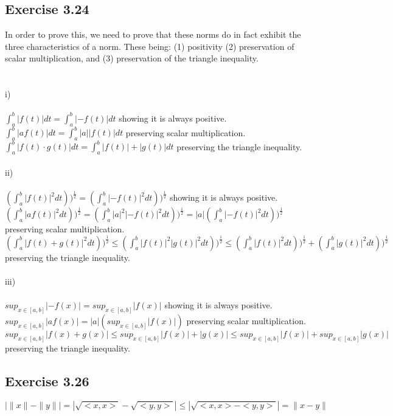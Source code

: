 \documentclass[letterpaper,12pt]{article}
\theoremstyle{definition}
\begin{document}
\subsection*{Exercise 3.24}
In order to prove this, we need to prove that these norms do in fact exhibit the three characteristics of a norm. These being: (1) positivity (2) preservation of scalar multiplication, and (3) preservation of the triangle inequality. \\ \\ \\ 
i) \\ \\
$\int_{a}^{b}|f(t)| dt = \int_{a}^{b}|-f(t)| dt$ showing it is always positive. \\
$\int_{a}^{b}|af(t)| dt = \int_{a}^{b}|a||f(t)| dt$ preserving scalar multiplication. \\
$\int_{a}^{b}|f(t) \cdot g(t)| dt = \int_{a}^{b}|f(t)| + |g(t)| dt$ preserving the triangle inequality. \\ \\
ii) \\ \\ 
$(\int_{a}^{b}|f(t)|^{2} dt))^{\frac{1}{2}} = (\int_{a}^{b}|-f(t)|^{2} dt))^{\frac{1}{2}}$ showing it is always positive. \\
$(\int_{a}^{b}|af(t)|^{2} dt))^{\frac{1}{2}} = (\int_{a}^{b}|a|^{2}|-f(t)|^{2} dt))^{\frac{1}{2}} = |a|(\int_{a}^{b}|-f(t)|^{2} dt))^{\frac{1}{2}}$ preserving scalar multiplication. \\
$(\int_{a}^{b}|f(t)+g(t)|^{2} dt))^{\frac{1}{2}} \leq (\int_{a}^{b}|f(t)|^{2}|g(t)|^{2} dt))^{\frac{1}{2}} \leq (\int_{a}^{b}|f(t)|^{2} dt))^{\frac{1}{2}} + (\int_{a}^{b}|g(t)|^{2} dt))^{\frac{1}{2}}$ preserving the triangle inequality. \\ \\
iii) \\ \\ 
$sup_{x \in [a,b]} |-f(x)| = sup_{x \in [a,b]} |f(x)|$ showing it is always positive.\\
$ sup_{x \in [a,b]} |af(x)| = |a| (sup_{x \in [a,b]} |f(x)|)$ preserving scalar multiplication.\\
$sup_{x \in [a,b]} |f(x) + g(x)| \leq sup_{x \in [a,b]} |f(x)| + |g(x)| \leq sup_{x \in [a,b]} |f(x)|+ sup_{x \in [a,b]} |g(x)|$ preserving the triangle inequality.\\

\subsection*{Exercise 3.26}
\[ |\|x\|-\|y\|| = |\sqrt{<x,x>} - \sqrt{<y,y>}| \leq |\sqrt{<x,x> - <y,y>}| = \| x-y \|  \]
\end{document}
